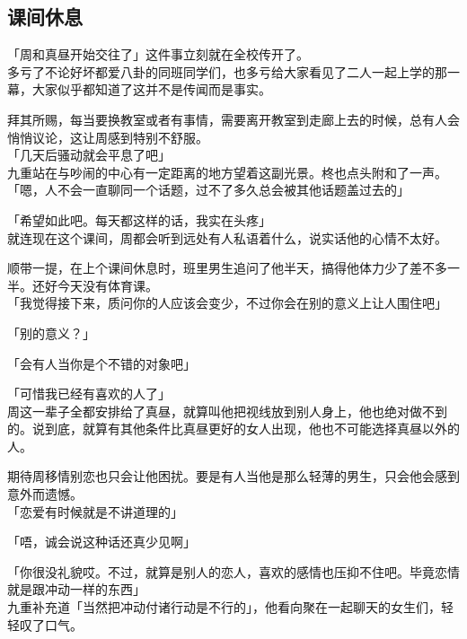 \subsection{课间休息}

「周和真昼开始交往了」这件事立刻就在全校传开了。\\

多亏了不论好坏都爱八卦的同班同学们，也多亏给大家看见了二人一起上学的那一幕，大家似乎都知道了这并不是传闻而是事实。

拜其所赐，每当要换教室或者有事情，需要离开教室到走廊上去的时候，总有人会悄悄议论，这让周感到特别不舒服。\\

「几天后骚动就会平息了吧」\\

九重站在与吵闹的中心有一定距离的地方望着这副光景。柊也点头附和了一声。\\

「嗯，人不会一直聊同一个话题，过不了多久总会被其他话题盖过去的」

「希望如此吧。每天都这样的话，我实在头疼」\\

就连现在这个课间，周都会听到远处有人私语着什么，说实话他的心情不太好。

顺带一提，在上个课间休息时，班里男生追问了他半天，搞得他体力少了差不多一半。还好今天没有体育课。\\

「我觉得接下来，质问你的人应该会变少，不过你会在别的意义上让人围住吧」

「别的意义？」

「会有人当你是个不错的对象吧」

「可惜我已经有喜欢的人了」\\

周这一辈子全都安排给了真昼，就算叫他把视线放到别人身上，他也绝对做不到的。说到底，就算有其他条件比真昼更好的女人出现，他也不可能选择真昼以外的人。

期待周移情别恋也只会让他困扰。要是有人当他是那么轻薄的男生，只会他会感到意外而遗憾。\\

「恋爱有时候就是不讲道理的」

「唔，诚会说这种话还真少见啊」

「你很没礼貌哎。不过，就算是别人的恋人，喜欢的感情也压抑不住吧。毕竟恋情就是跟冲动一样的东西」\\

九重补充道「当然把冲动付诸行动是不行的」，他看向聚在一起聊天的女生们，轻轻叹了口气。\\

